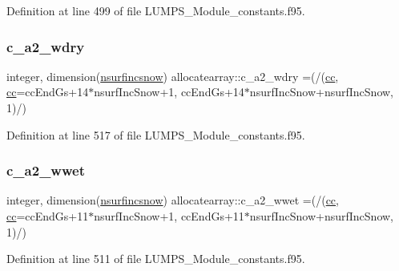 Definition at line 499 of file L\+U\+M\+P\+S\+\_\+\+Module\+\_\+constants.\+f95.

\mbox{\label{namespaceallocatearray_ae537fc0a303aa7ab49bd478a2cdd9798}} 
\subsubsection{\texorpdfstring{c\+\_\+a2\+\_\+wdry}{c\_a2\_wdry}}
{\footnotesize\ttfamily integer, dimension(\hyperlink{namespaceallocatearray_af4d113f332b6759cfa22271140c9162d}{nsurfincsnow}) allocatearray\+::c\+\_\+a2\+\_\+wdry =(/(\hyperlink{namespaceallocatearray_ac863c81704eb507dee10f5e10741e10c}{cc}, \hyperlink{namespaceallocatearray_ac863c81704eb507dee10f5e10741e10c}{cc}=cc\+End\+Gs+14$\ast$nsurf\+Inc\+Snow+1, cc\+End\+Gs+14$\ast$nsurf\+Inc\+Snow+nsurf\+Inc\+Snow, 1)/)}



Definition at line 517 of file L\+U\+M\+P\+S\+\_\+\+Module\+\_\+constants.\+f95.

\mbox{\label{namespaceallocatearray_af34e6c63b5df6dcc656b4434f8e6790f}} 
\subsubsection{\texorpdfstring{c\+\_\+a2\+\_\+wwet}{c\_a2\_wwet}}
{\footnotesize\ttfamily integer, dimension(\hyperlink{namespaceallocatearray_af4d113f332b6759cfa22271140c9162d}{nsurfincsnow}) allocatearray\+::c\+\_\+a2\+\_\+wwet =(/(\hyperlink{namespaceallocatearray_ac863c81704eb507dee10f5e10741e10c}{cc}, \hyperlink{namespaceallocatearray_ac863c81704eb507dee10f5e10741e10c}{cc}=cc\+End\+Gs+11$\ast$nsurf\+Inc\+Snow+1, cc\+End\+Gs+11$\ast$nsurf\+Inc\+Snow+nsurf\+Inc\+Snow, 1)/)}



Definition at line 511 of file L\+U\+M\+P\+S\+\_\+\+Module\+\_\+constants.\+f95.

\mbox{\label{namespaceallocatearray_a61e51307f223225bb90ad6bd605f016f}} 
